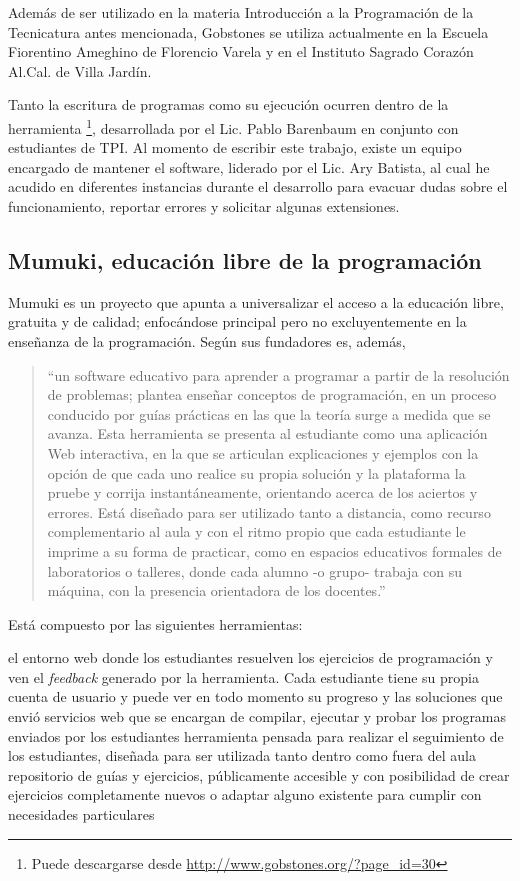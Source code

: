 Además de ser utilizado en la materia Introducción a la Programación de la Tecnicatura antes mencionada, Gobstones se utiliza actualmente en la Escuela Fiorentino Ameghino de Florencio Varela y en el Instituto Sagrado Corazón Al.Cal. de Villa Jardín.

Tanto la escritura de programas como su ejecución ocurren dentro de la herramienta \pyGob \footnote{Puede descargarse desde \url{http://www.gobstones.org/?page_id=30}}, desarrollada por el Lic. Pablo Barenbaum en conjunto con estudiantes de TPI. Al momento de escribir este trabajo, existe un equipo encargado de mantener el software, liderado por el Lic. Ary Batista, al cual he acudido en diferentes instancias durante el desarrollo para evacuar dudas sobre el funcionamiento, reportar errores y solicitar algunas extensiones.

\subsection{Mumuki, educación libre de la programación}
Mumuki es un proyecto que apunta a universalizar el acceso a la educación libre, gratuita y de calidad; enfocándose principal pero no excluyentemente en la enseñanza de la programación. Según sus fundadores es, además,

\begin{quote}
``un software educativo para aprender a programar a partir de la resolución de problemas; plantea enseñar conceptos de programación, en un proceso conducido por guías prácticas en las que la teoría surge a medida que se avanza. Esta herramienta se presenta al estudiante como una aplicación Web interactiva, en la que se articulan explicaciones y ejemplos con la opción de que cada uno realice su propia solución y la plataforma la pruebe y corrija instantáneamente, orientando acerca de los aciertos y errores. Está diseñado para ser utilizado tanto a distancia, como recurso complementario al aula y con el ritmo propio que cada estudiante le imprime a su forma de practicar, como en espacios educativos formales de laboratorios o talleres, donde cada alumno -o grupo- trabaja con su máquina, con la presencia orientadora de los docentes.''\cite{PaperMumuki}
\end{quote}

Está compuesto por las siguientes herramientas:
\begin{itemize}
   el entorno web donde los estudiantes resuelven los ejercicios de programación y ven el \textit{feedback} generado por la herramienta. Cada estudiante tiene su propia cuenta de usuario y puede ver en todo momento su progreso y las soluciones que envió
   servicios web que se encargan de compilar, ejecutar y probar los programas enviados por los estudiantes
   herramienta pensada para realizar el seguimiento de los estudiantes, diseñada para ser utilizada tanto dentro como fuera del aula
   repositorio de guías y ejercicios, públicamente accesible y con posibilidad de crear ejercicios completamente nuevos o adaptar alguno existente para cumplir con necesidades particulares
\end{itemize}

